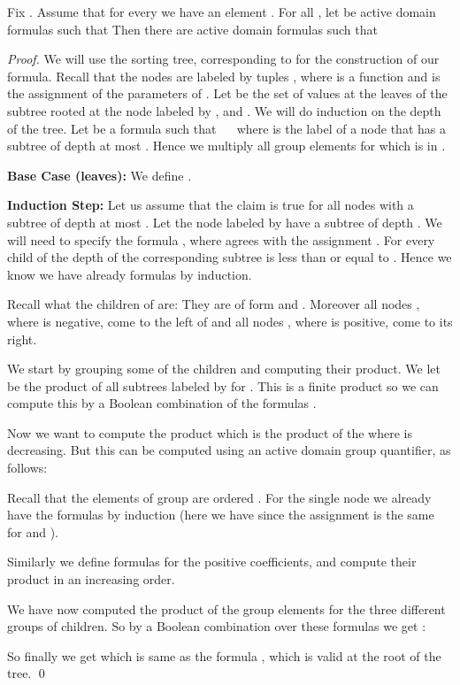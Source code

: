 \documentclass[envcountsame]{llncs}
\begin{document}
\begin{lemma}\label{lem_treelemma}
Fix . Assume that for every  we have an element .
For all ,  let  be active domain formulas  such that 
Then there are active domain formulas  such that 
\end{lemma}
\begin{proof}
We will use the sorting tree,  corresponding to  for the construction of our formula. 
Recall that the nodes are labeled by tuples , where  is a function and  is the assignment of the parameters of . Let  be the set of values at the leaves of the subtree rooted at the node labeled by , and .
We will do induction on the depth  of the tree.
Let  be a formula such that 
~~ where  is the label of a node that has a subtree of depth at most .
Hence we multiply all group elements  for which  is in .

{\bf Base Case (leaves):} 
We define .

{\bf Induction Step:} Let us assume that the claim is true for all nodes with a subtree of depth at most .
Let the node labeled by  have a subtree of depth . We will need to specify the formula , where  agrees with the assignment .
For every child  of  the depth of the corresponding subtree is less than or equal to . Hence we know we have already formulas by induction.

Recall what the children of  are: They are of form  and . Moreover all nodes
, where  is
negative, come to the left of  and all nodes , where  is positive, come to its right.

We start by grouping some of the children and computing their product.
We let  be the product of all subtrees labeled by  for .
This is a finite product so we can compute this by a Boolean combination of the formulas .

Now we want to compute the product  which is the product of the  where  is decreasing.
But this can be computed using an active domain group quantifier,  as follows:

 
Recall that the elements of group  are ordered .
For the single node  we already have the formulas  by induction (here we have  since the assignment  is the same for  and ).

Similarly we define formulas  for the positive coefficients, and compute their product  in an increasing order.



We have now computed the product of the group elements for the three different groups of children. So by a Boolean combination over
these formulas we get :

So finally we get  which is same as the formula , which is valid at the root of the tree.
\qed \end{proof}
\end{document}
